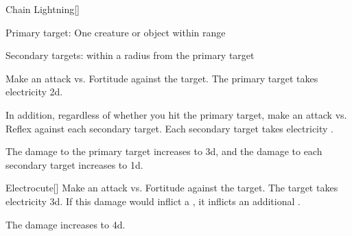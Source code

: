 \lowercase{\hypertarget{spell:Chain Lightning}{}}\label{spell:Chain Lightning}
\begin{freeability}[Rank 5]{\hypertarget{spell:Chain Lightning}{Chain Lightning}}[]

Primary target: One creature or object within \rngmed range
\par\noindent
Secondary targets:  within a \areasmall radius from the primary target

Make an attack vs. Fortitude against the target.
\hit The primary target takes electricity  \plus2d.

In addition, regardless of whether you hit the primary target, make an attack vs. Reflex against each secondary target.
\hit Each secondary target takes electricity .

\rankline
{} The damage to the primary target increases to  \plus3d, and the damage to each secondary target increases to  \plus1d.
\end{freeability}
\vspace{0.25em}



\lowercase{\hypertarget{spell:Electrocute}{}}\label{spell:Electrocute}
\begin{freeability}[Rank 5]{\hypertarget{spell:Electrocute}{Electrocute}}[]
Make an attack vs. Fortitude against the target.
\hit The target takes electricity  \plus3d.
If this damage would inflict a , it inflicts an additional .

\rankline
{} The damage increases to  \plus4d.
\end{freeability}
\vspace{0.25em}



